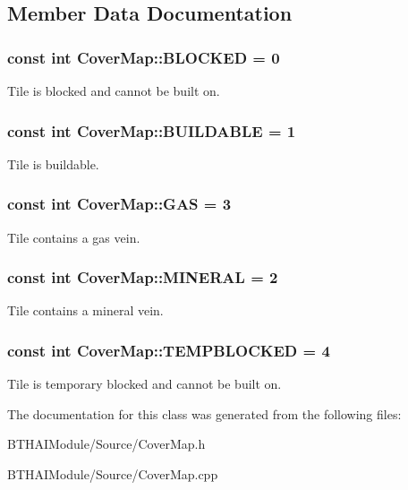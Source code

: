 \subsection{Member Data Documentation}
\hypertarget{class_cover_map_a39ca0fa62d0d64888eb11eea0885fa80}{
\subsubsection[{BLOCKED}]{\setlength{\rightskip}{0pt plus 5cm}const int {\bf CoverMap::BLOCKED} = 0}}
\label{class_cover_map_a39ca0fa62d0d64888eb11eea0885fa80}
Tile is blocked and cannot be built on. \hypertarget{class_cover_map_a0d4d47ca7b4daf26d5eb421abb01a842}{
\subsubsection[{BUILDABLE}]{\setlength{\rightskip}{0pt plus 5cm}const int {\bf CoverMap::BUILDABLE} = 1}}
\label{class_cover_map_a0d4d47ca7b4daf26d5eb421abb01a842}
Tile is buildable. \hypertarget{class_cover_map_a5a178427ea42b747890f537e9627beef}{
\subsubsection[{GAS}]{\setlength{\rightskip}{0pt plus 5cm}const int {\bf CoverMap::GAS} = 3}}
\label{class_cover_map_a5a178427ea42b747890f537e9627beef}
Tile contains a gas vein. \hypertarget{class_cover_map_a0e9b93904f0aa5af78b197cae5805911}{
\subsubsection[{MINERAL}]{\setlength{\rightskip}{0pt plus 5cm}const int {\bf CoverMap::MINERAL} = 2}}
\label{class_cover_map_a0e9b93904f0aa5af78b197cae5805911}
Tile contains a mineral vein. \hypertarget{class_cover_map_a0dec904690c6527b04b0af293009e248}{
\subsubsection[{TEMPBLOCKED}]{\setlength{\rightskip}{0pt plus 5cm}const int {\bf CoverMap::TEMPBLOCKED} = 4}}
\label{class_cover_map_a0dec904690c6527b04b0af293009e248}
Tile is temporary blocked and cannot be built on. 

The documentation for this class was generated from the following files:\begin{DoxyCompactItemize}
\item 
BTHAIModule/Source/CoverMap.h\item 
BTHAIModule/Source/CoverMap.cpp\end{DoxyCompactItemize}
